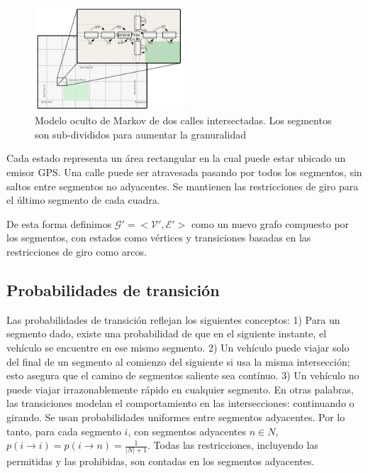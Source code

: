 \begin{figure}[!htp]
	\centering
	\includegraphics[width=0.5\textwidth]{images/segmentos_cortos.png}
	\captionsetup{width=.6\linewidth}
    \caption{Modelo oculto de Markov de dos calles intersectadas. Los segmentos son sub-divididos para aumentar la granuralidad}
    \label{fig:segmentos-cortos}
\end{figure}

Cada estado representa un área rectangular en la cual puede estar ubicado un emisor GPS. Una calle puede ser atravesada pasando por todos los segmentos, sin saltos entre segmentos no adyacentes. Se mantienen las restricciones de giro para el último segmento de cada cuadra.

De esta forma definimos \(\mathcal{G'=<V',E'>}\) como un nuevo grafo compuesto por los segmentos, con estados como vértices y transiciones basadas en las restricciones de giro como arcos.

\subsection{Probabilidades de transición}

Las probabilidades de transición reflejan los siguientes conceptos: 1) Para un segmento dado, existe una probabilidad de que en el siguiente instante, el vehículo se encuentre en ese mismo segmento. 2) Un vehículo puede viajar solo del final de un segmento al comienzo del siguiente si usa la misma intersección; esto asegura que el camino de segmentos saliente sea contínuo. 3) Un vehículo no puede viajar irrazonablemente rápido en cualquier segmento. En otras palabras, las transiciones modelan el comportamiento en las intersecciones: continuando o girando. Se usan probabilidades uniformes entre segmentos adyacentes. Por lo tanto, para cada segmento $i$, con segmentos adyacentes $n \in N$, $p(i\rightarrow i) = p(i\rightarrow n)= \frac{1}{|N|+1} $. Todas las restricciones, incluyendo las permitidas y las prohibidas, son contadas en los segmentos adyacentes.

